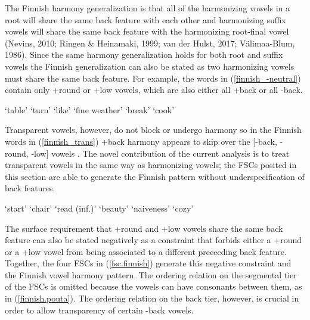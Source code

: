 \documentclass[,doc,floatsintext]{apa6}
\theoremstyle{definition}
\theoremstyle{definition}
\theoremstyle{definition}
\theoremstyle{remark}
\begin{document}
The Finnish harmony generalization is that all of the harmonizing vowels
in a root will share the same back feature with each other and
harmonizing suffix vowels will share the same back feature with the
harmonizing root-final vowel (Nevins, 2010; Ringen \& Heinamaki, 1999;
van der Hulst, 2017; Välimaa-Blum, 1986). Since the same harmony
generalization holds for both root and suffix vowels the Finnish
generalization can also be stated as two harmonizing vowels must share
the same back feature. For example, the words in
(\ref{finnish_-neutral}) contain only +round or +low vowels, which are
also either all +back or all -back. \newpage

\begin{exe}
\label{finnish_-neutral}
\begin{xlist}
  \ex {} `table'
  \ex {} `turn'
  \ex {} `like'
  \ex {} `fine weather'
  \ex {} `break'
  \ex {} `cook'
  \end{xlist}
\end{exe}

Transparent vowels, however, do not block or undergo harmony so in the
Finnish words in (\ref{finnish_trans}) +back harmony appears to skip
over the {[}-back, -round, -low{]} vowels \textipa{[i, i:, e, e:]}. The
novel contribution of the current analysis is to treat transparent
vowels in the same way as harmonizing vowels; the FSCs posited in this
section are able to generate the Finnish pattern without
underspecification of back features.

\begin{exe}
\label{finnish_trans}
\begin{xlist}
  \ex {} `start'
  \ex {} `chair'
  \ex {} `read (inf.)'
  \ex {} `beauty'
  \ex {} `naiveness'
  \ex {} `cozy'
  \end{xlist}
\end{exe}

The surface requirement that +round and +low vowels share the same back
feature can also be stated negatively as a constraint that forbids
either a +round or a +low vowel from being associated to a different
preceeding back feature. Together, the four FSCs in (\ref{fsc.finnish})
generate this negative constraint and the Finnish vowel harmony pattern.
The ordering relation on the segmental tier of the FSCs is omitted
because the vowels can have consonants between them, as in
(\ref{finnish.pouta}). The ordering relation on the back tier, however,
is crucial in order to allow transparency of certain -back vowels.
\end{document}
